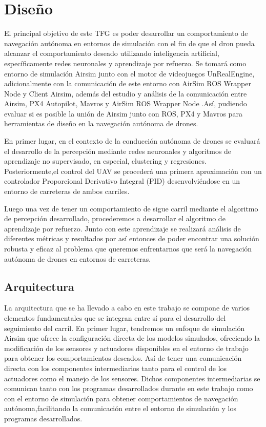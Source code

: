 \chapter{Diseño}
\label{cap:capitulo4}


\vspace{1cm}
El principal objetivo de este TFG es poder desarrollar un comportamiento de navegación autónoma en entornos de simulación 
con el fin de que el dron pueda alcanzar el comportamiento deseado utilizando inteligencia artificial, específicamente redes neuronales
y aprendizaje por refuerzo. Se tomará como entorno de simulación Airsim junto con el motor de videojuegos UnRealEngine, adicionalmente con 
la comunicación de este entorno con AirSim ROS Wrapper Node y Client Airsim, además del estudio y 
análisis de la comunicación entre Airsim, PX4 Autopilot, Mavros y AirSim ROS Wrapper Node .Así, pudiendo evaluar si es posible la unión de Airsim junto con ROS, PX4 y Mavros para
herramientas de diseño en la navegación autónoma de drones. \newline

En primer lugar, en el contexto de la conducción autónoma de drones se evaluará el desarrollo de la percepción mediante redes neuronales y algoritmos de
aprendizaje no supervisado, en especial, clustering y regresiones. 
Posteriormente,el control del UAV se procederá una primera aproximación con un controlador Proporcional Derivativo Integral (PID) desenvolviéndose
en un entorno de carreteras de ambos carriles. \newline

Luego una vez de tener un comportamiento de sigue carril mediante el algoritmo de percepción desarrollado, procederemos a desarrollar el algoritmo de 
aprendizaje por refuerzo. Junto con este aprendizaje se realizará análisis de diferentes métricas y resultados
por así entonces de poder encontrar una solución robusta y eficaz al problema que queremos enfrentarnos que será la navegación autónoma de drones en
entornos de carreteras. \newline


\section{Arquitectura}
\label{sec:Arquitectura}

La arquitectura que se ha llevado a cabo en este trabajo se compone de varios elementos fundamentales que se integran entre sí para el desarrollo del seguimiento
del carril. En primer lugar, tendremos un enfoque de simulación Airsim que ofrece la configuración directa de los modelos simulados, ofreciendo la modificación de los sensores
y actuadores disponibles en el entorno de trabajo para obtener los comportamientos deseados. Así de tener una comunicación directa con los componentes intermediarios 
tanto para el control de los actuadores como el manejo de los sensores. Dichos componentes intermediarias se comunican tanto con los programas desarrollados durante en este 
trabajo como con el entorno de simulación para obtener comportamientos de navegación autónoma,facilitando la comunicación entre el entorno de simulación y los programas desarrollados.\newline


